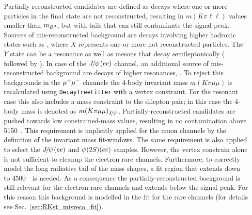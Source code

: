 Partially-reconstructed candidates are defined as decays where one or more particles in the final state are not reconstructed,
resulting in $m(K\pi\ell\ell)$ values smaller than $m_{{{B}^0}}$, but with tails that can still contaminate the signal peak.
Sources of mis-reconstructed background are decays involving higher hadronic states such as 
, where $X$ represents one or more not reconstructed particles. 
The $Y$ state can be a \Kstar resonance as well as \D mesons that decay semileptonically (\eg \decay{\Bz}{\Dm\ell^+ \bar{\nu_\ell}}
followed by \decay{\Dm}{\Kstarz \ell^- \nu_\ell}). In case of the $\jpsi(ee)$ channel, an additional source of mis-reconstructed 
background are decays of higher \ccbar resonances, .
%
To reject this backgrounds in the ${\mu^+\mu^-}$ channels the 4-body invariant mass $m(K\pi\mu\mu)$ is recalculated using 
\verb!DecayTreeFitter! with a vertex constraint. For the resonant case this also includes a \jpsi mass constraint to the dilepton pair;
in this case the 4-body mass is denoted as $m(K\pi\mu\mu)_{\jpsi}$. Partially-reconstructed candidates are pushed towards 
low constrained-mass values, resulting in no contamination above 5150~\mevcc. This requirement is implicitly applied 
for the muon channels by the definition of the invariant mass fit-windows. 
The same requirement is also applied to select the $\jpsi(ee)$ and $\psitwos(ee)$ samples.
However, the vertex constrain alone is not sufficient to cleanup the electron rare channels.
Furthermore, to correctly model the long radiative tail of the mass shapes, a fit region that extends 
down to 4500~\mevcc~is needed. As a consequence the partially-reconstructed background is still relevant
for the electron rare channels and extends below the signal peak. For this reason this background is modelled 
in the fit for the rare channels (for details see Sec.~\ref{sec:RKst_misreco_fit}).


%

